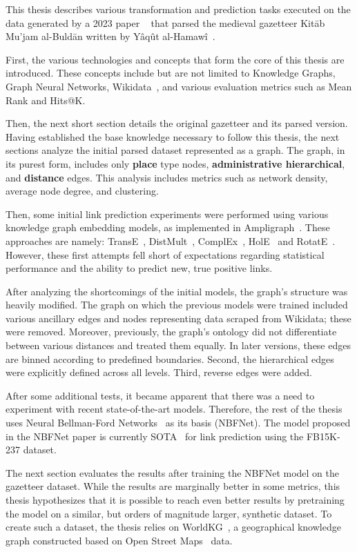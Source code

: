 This thesis describes various transformation and prediction tasks executed on the data generated by a 2023 paper ~\cite{YaqutRB}
that parsed the medieval gazetteer Kitāb Mu'jam al-Buldān written by Yâqût al-Hamawî~\cite{Yaqut}.

First, the various technologies and concepts that form the core of this thesis are introduced.
These concepts include but are not limited to Knowledge Graphs, Graph Neural Networks, Wikidata~\cite{Wikidata}, and various
evaluation metrics such as Mean Rank and Hits@K.

Then, the next short section details the original gazetteer and its parsed version.
Having established the base knowledge necessary to follow this thesis, the next sections analyze the initial parsed dataset represented as a graph.
The graph, in its purest form, includes only \textbf{place} type nodes,  \textbf{administrative hierarchical}, and \textbf{distance} edges.
This analysis includes metrics such as network density, average node degree, and clustering.

Then, some initial link prediction experiments were performed using various knowledge graph embedding models, as implemented in Ampligraph~\cite{ampligraph}.
These approaches are namely: TransE~\cite{TransE}, DistMult~\cite{DistMult}, ComplEx~\cite{ComplEx}, HolE~\cite{HolE} and RotatE~\cite{RotatE}.
However, these first attempts fell short of expectations regarding statistical performance and the ability to predict new, true positive links.

After analyzing the shortcomings of the initial models, the graph's structure was heavily modified.
The graph on which the previous models were trained included various ancillary edges and nodes representing data scraped from Wikidata; these were removed.
Moreover, previously, the graph's ontology did not differentiate between various distances and treated them equally.
In later versions, these edges are binned according to predefined boundaries.
Second, the hierarchical edges were explicitly defined across all levels.
Third, reverse edges were added.

After some additional tests, it became apparent that there was a need to experiment with recent state-of-the-art models.
Therefore, the rest of the thesis uses Neural Bellman-Ford Networks~\cite{NBFNet} as its basis (NBFNet).
The model proposed in the NBFNet paper is currently SOTA~\cite{NBFNetSota} for link prediction using the FB15K-237 dataset.

The next section evaluates the results after training the NBFNet model on the gazetteer dataset.
While the results are marginally better in some metrics, this thesis hypothesizes that it is possible to reach even better results
by pretraining the model on a similar, but orders of magnitude larger, synthetic dataset.
To create such a dataset, the thesis relies on WorldKG~\cite{WorldKG}, a geographical knowledge graph constructed based on Open Street
Maps~\cite{OpenStreetMap} data.

